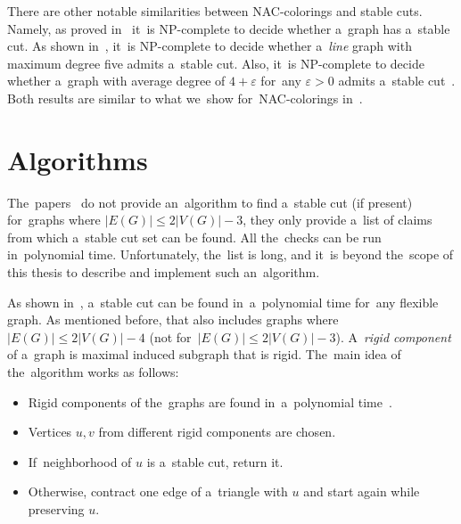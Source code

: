 There are other notable similarities between NAC-colorings and stable cuts.
Namely, as proved in~\cite{stable_cuts_complexity_base} it~is NP-complete
to decide whether a~graph has a~stable cut.
As shown in~\cite{stable_cuts_complexity_deg_five},
it~is NP-complete to decide whether a~\emph{line} graph with maximum degree five
admits a~stable cut.
%
Also, it~is NP-complete to decide whether a~graph with average degree of
$4+\varepsilon$ for~any $\varepsilon > 0$ admits a~stable cut~\cite{stable_cuts_complexity_deg_five}.
Both results are similar to what we~show for~NAC-colorings in~.
%

\section{Algorithms}%
\label{sec:stable_cut_algo}

The~papers~\cite{stable_cuts_2v_3,stable_cuts_2v_3_revisit} do not provide
an~algorithm to find a~stable cut (if present)
for~graphs where \(|E(G)| \le 2|V(G)|-3 \),
they only provide a~list of claims
from which a~stable cut set can be found.
All the~checks can be run in~polynomial time.
Unfortunately, the~list is long,
and it~is beyond the~scope of this thesis
to describe and implement such an~algorithm.

As shown in~\cite[Algorithm 1]{stable_cuts_legersky}, a~stable cut can be found
in~a~polynomial time for~any flexible graph.
As mentioned before, that also includes graphs
where \( |E(G)| \le 2|V(G)| - 4 \) (not for~\( |E(G)| \le 2|V(G)| - 3 \)).
A~\emph{rigid component} of a~graph is maximal induced subgraph that is rigid.
The~main idea of the~algorithm works as follows:
%
\begin{itemize}
	\item Rigid components of the~graphs are found in~a~polynomial time~\cite{rigid_components_pebble_game}.
	\item Vertices \( u, v \) from different rigid components are chosen.
	\item If~neighborhood of \( u \) is a~stable cut, return it.
	\item Otherwise, contract one edge of a~triangle with \( u \) and start again while preserving \( u \).
\end{itemize}

